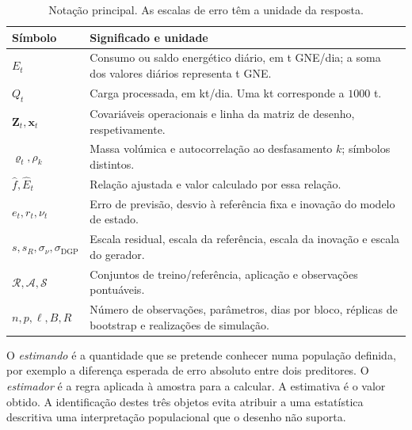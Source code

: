 \begin{table}[htbp]
\centering\small
\caption{Notação principal. As escalas de erro têm a unidade da resposta.}
\label{tab:mat-notacao}
\begin{tabularx}{\linewidth}{@{}lX@{}}\toprule
Símbolo & Significado e unidade\\\midrule
$E_t$ & Consumo ou saldo energético diário, em t GNE/dia; a soma dos valores diários representa t GNE.\\
$Q_t$ & Carga processada, em kt/dia. Uma kt corresponde a $1000$ t.\\
$\boldsymbol Z_t,\boldsymbol x_t$ & Covariáveis operacionais e linha da matriz de desenho, respetivamente.\\
$\varrho_t,\rho_k$ & Massa volúmica e autocorrelação ao desfasamento $k$; símbolos distintos.\\
$\widehat f,\widehat E_t$ & Relação ajustada e valor calculado por essa relação.\\
$e_t,r_t,\nu_t$ & Erro de previsão, desvio à referência fixa e inovação do modelo de estado.\\
$s, s_R,\sigma_\nu,\sigma_{\mathrm{DGP}}$ & Escala residual, escala da referência, escala da inovação e escala do gerador.\\
$\mathcal R,\mathcal A,\mathcal S$ & Conjuntos de treino/referência, aplicação e observações pontuáveis.\\
$n,p,\ell,B,R$ & Número de observações, parâmetros, dias por bloco, réplicas de bootstrap e realizações de simulação.\\\bottomrule
\end{tabularx}
\end{table}

O \emph{estimando} é a quantidade que se pretende conhecer numa população definida, por exemplo a diferença esperada de erro absoluto entre dois preditores. O \emph{estimador} é a regra aplicada à amostra para a calcular. A estimativa é o valor obtido. A identificação destes três objetos evita atribuir a uma estatística descritiva uma interpretação populacional que o desenho não suporta.

